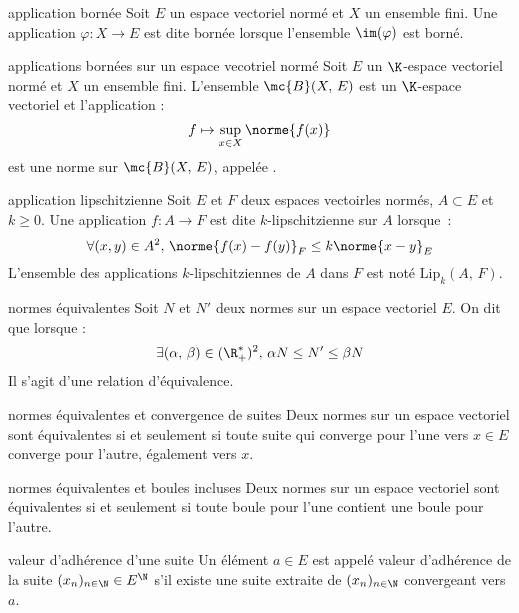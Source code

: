 \begin{adjustwidth}{-3cm}{-3cm}
\begin{definition}{3.19}{application bornée}
    Soit $E$ un espace vectoriel normé et $X$ un ensemble fini. Une application $\varphi : X \to E$ est dite bornée lorsque l'ensemble $\im(\varphi)    $ est borné.
\end{definition}

\begin{definition}{3.20}{applications bornées sur un espace vecotriel normé}
    Soit $E$ un $\K$-espace vectoriel normé et $X$ un ensemble fini. L'ensemble $\mc{B}(X,\,E)$ est un $\K$-espace vectoriel et l'application : 
    $$f \mapsto \sup_{x \in X}\norme{f(x)}$$
    est une norme sur $\mc{B}(X,\,E)$, appelée .
\end{definition}

\begin{definition}{3.21}{application lipschitzienne}
    Soit $E$ et $F$ deux espaces vectoirles normés, $A \subset E$ et $k \geq 0$. Une application $f : A \to F$ est dite $k$-lipschitzienne sur $A$ lorsque~:
    $$\forall (x,y) \in A^2,\, \norme{f(x) -  f(y)}_F \leq k\norme{x-y}_E$$
    L'ensemble des applications $k$-lipschitziennes de $A$ dans $F$ est noté $\text{Lip}_k(A,\, F)$.
\end{definition}

\begin{definition}{3.30}{normes équivalentes} 
    Soit $N$ et $N'$ deux normes sur un espace vectoriel $E$. On dit que  lorsque :
    $$\exists(\alpha,\, \beta) \in (\R_+^*)^2,\, \alpha N \leq N' \leq \beta N$$
    Il s'agit d'une relation d'équivalence.
\end{definition}

\begin{proposition}{3.31}{normes équivalentes et convergence de suites}
    Deux normes sur un espace vectoriel sont équivalentes si et seulement si toute suite qui converge pour l'une vers $x \in E$ converge pour l'autre, également vers $x$.
\end{proposition}

\begin{proposition}{3.32}{normes équivalentes et boules incluses}
    Deux normes sur un espace vectoriel sont équivalentes si et seulement si toute boule pour l'une contient une boule pour l'autre.
\end{proposition}

\begin{definition}{3.37}{valeur d'adhérence d'une suite}
    Un élément $a \in E$ est appelé valeur d'adhérence de la suite $(x_n)_{n \in \N} \in E^\N$ s'il existe une suite extraite de $(x_n)_{n \in \N}$ convergeant vers $a$.
\end{definition}


\end{adjustwidth}
